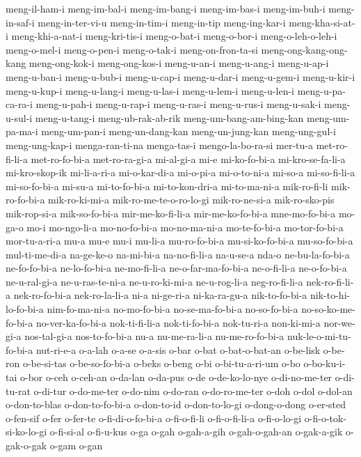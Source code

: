 {meng-il-ham-i meng-im-bal-i meng-im-bang-i meng-im-bas-i meng-im-buh-i
meng-in-saf-i meng-in-ter-vi-u meng-in-tim-i meng-in-tip meng-ing-kar-i
meng-kha-si-at-i meng-khi-a-nat-i meng-kri-tis-i meng-o-bat-i meng-o-bor-i
meng-o-leh-o-leh-i meng-o-mel-i meng-o-pen-i meng-o-tak-i
meng-on-fron-ta-si meng-ong-kang-ong-kang meng-ong-kok-i meng-ong-kos-i
meng-u-an-i meng-u-ang-i meng-u-ap-i meng-u-ban-i meng-u-bub-i
meng-u-cap-i meng-u-dar-i meng-u-gem-i meng-u-kir-i meng-u-kup-i
meng-u-lang-i meng-u-las-i meng-u-lem-i meng-u-len-i meng-u-pa-ca-ra-i
meng-u-pah-i meng-u-rap-i meng-u-ras-i meng-u-rus-i meng-u-sak-i
meng-u-sul-i meng-u-tang-i meng-ub-rak-ab-rik meng-um-bang-am-bing-kan
meng-um-pa-ma-i meng-um-pan-i meng-un-dang-kan meng-un-jung-kan
meng-ung-gul-i meng-ung-kap-i menga-ran-ti-na menga-tas-i
mengo-la-bo-ra-si mer-tu-a met-ro-fi-li-a met-ro-fo-bi-a met-ro-ra-gi-a
mi-al-gi-a mi-e mi-ko-fo-bi-a mi-kro-se-fa-li-a mi-kro-skop-ik
mi-li-a-ri-a mi-o-kar-di-a mi-o-pi-a mi-o-to-ni-a mi-so-a mi-so-fi-li-a
mi-so-fo-bi-a mi-su-a mi-to-fo-bi-a mi-to-kon-dri-a mi-to-ma-ni-a
mik-ro-fi-li mik-ro-fo-bi-a mik-ro-ki-mi-a mik-ro-me-te-o-ro-lo-gi
mik-ro-ne-si-a mik-ro-sko-pis mik-rop-si-a mik-so-fo-bi-a
mir-me-ko-fi-li-a mir-me-ko-fo-bi-a mne-mo-fo-bi-a mo-ga-o mo-i
mo-ngo-li-a mo-no-fo-bi-a mo-no-ma-ni-a mo-te-fo-bi-a mo-tor-fo-bi-a
mor-tu-a-ri-a mu-a mu-e mu-i mu-li-a mu-ro-fo-bi-a mu-si-ko-fo-bi-a
mu-so-fo-bi-a mul-ti-me-di-a na-ge-ke-o na-mi-bi-a na-no-fi-li-a na-u-se-a
nda-o ne-bu-la-fo-bi-a ne-fo-fo-bi-a ne-lo-fo-bi-a ne-mo-fi-li-a
ne-o-far-ma-fo-bi-a ne-o-fi-li-a ne-o-fo-bi-a ne-u-ral-gi-a
ne-u-ras-te-ni-a ne-u-ro-ki-mi-a ne-u-rog-li-a neg-ro-fi-li-a
nek-ro-fi-li-a nek-ro-fo-bi-a nek-ro-la-li-a ni-a ni-ge-ri-a ni-ka-ra-gu-a
nik-to-fo-bi-a nik-to-hi-lo-fo-bi-a nim-fo-ma-ni-a no-mo-fo-bi-a
no-se-ma-fo-bi-a no-so-fo-bi-a no-so-ko-me-fo-bi-a no-ver-ka-fo-bi-a
nok-ti-fi-li-a nok-ti-fo-bi-a nok-tu-ri-a non-ki-mi-a nor-we-gi-a
nos-tal-gi-a nos-to-fo-bi-a nu-a nu-me-ra-li-a nu-me-ro-fo-bi-a
nuk-le-o-mi-tu-fo-bi-a nut-ri-e-a o-a-lah o-a-se o-a-sis o-bar o-bat
o-bat-o-bat-an o-be-lisk o-be-ron o-be-si-tas o-be-so-fo-bi-a o-beks
o-beng o-bi o-bi-tu-a-ri-um o-bo o-bo-ku-i-tai o-bor o-ceh o-ceh-an
o-da-lan o-da-pus o-de o-de-ko-lo-nye o-di-no-me-ter o-di-tu-rat o-di-tur
o-do-me-ter o-do-nim o-do-ran o-do-ro-me-ter o-doh o-dol o-dol-an
o-don-to-blas o-don-to-fo-bi-a o-don-to-id o-don-to-lo-gi o-dong-o-dong
o-er-sted o-fen-sif o-fer o-fer-te o-fi-di-o-fo-bi-a o-fi-o-fi-li
o-fi-o-fi-li-a o-fi-o-lo-gi o-fi-o-tok-si-ko-lo-gi o-fi-si-al o-fi-u-kus
o-ga o-gah o-gah-a-gih o-gah-o-gah-an o-gak-a-gik o-gak-o-gak o-gam o-gan
}
